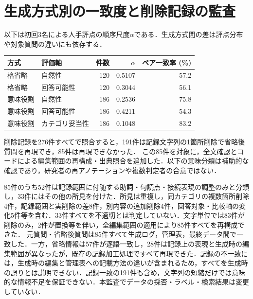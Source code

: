 \documentclass[twocolumn,a4paper,10pt]{ltjsarticle}
\begin{document}
\section{生成方式別の一致度と削除記録の監査}
\label{app:agreement}
以下は初回3名による人手評点の順序尺度$\alpha$である．生成方式間の差は評点分布や対象質問の違いにも依存する．
\begin{center}\small\setlength{\tabcolsep}{3pt}
\begin{tabular}{llrrr}
\toprule
方式 & 評価軸 & 件数 & $\alpha$ & ペア一致率 (\%) \\
\midrule
格省略 & 自然性 & 120 & 0.5107 & 57.2 \\
格省略 & 回答可能性 & 120 & 0.3044 & 56.1 \\
意味役割 & 自然性 & 186 & 0.2536 & 75.8 \\
意味役割 & 回答可能性 & 186 & 0.4211 & 54.3 \\
意味役割 & カテゴリ妥当性 & 186 & 0.1048 & 83.2 \\
\bottomrule
\end{tabular}
\label{tab:agreementgroup}
\end{center}
削除記録を276件すべてで照合すると，191件は記録文字列の1箇所削除で省略後質問を再現でき，85件は再現できなかった．
この85件を対象に，全文確認とコードによる編集範囲の再構成・出典照合を追加した．以下の意味分類は補助的な確認であり，研究者の再アノテーションや複数判定者の合意ではない．

85件のうち52件は記録範囲に付随する助詞・句読点・接続表現の調整のみと分類し，33件にはその他の所見を付けた．所見は重複し，同カテゴリの複数箇所削除4件，記録範囲と実削除の差8件，別内容の追加削除4件，回答対象・比較軸の変化5件等を含む．33件すべてを不適切とは判定していない．文字単位では83件が削除のみ，2件が置換等を伴い，全編集範囲の適用により85件すべてを再構成できた．
元質問・省略後質問は85件すべて生成ログ，管理表，最終データ間で一致した．一方，省略情報は57件が逐語一致し，28件は記録上の表現と生成時の編集範囲が異なったが，既存の記録加工処理ですべて再現できた．記録の不一致には，生成時の編集と管理表への記載方法の違いが含まれるため，すべてを生成時の誤りとは説明できない．記録一致の191件も含め，文字列の短縮だけでは意味的な情報不足を保証できない．本監査でデータの採否・ラベル・検索結果は変更していない．
\end{document}
